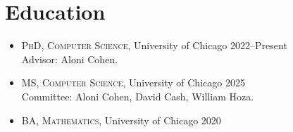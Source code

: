 
\section{Education}
\begin{itemize}
\item \textsc{PhD, Computer Science}, University of Chicago \hfill 2022--Present\\
Advisor: Aloni Cohen.
\item \textsc{MS, Computer Science}, University of Chicago \hfill 2025 \\
Committee: Aloni Cohen, David Cash, William Hoza.
\item \textsc{BA, Mathematics}, University of Chicago \hfill 2020 
\end{itemize}

